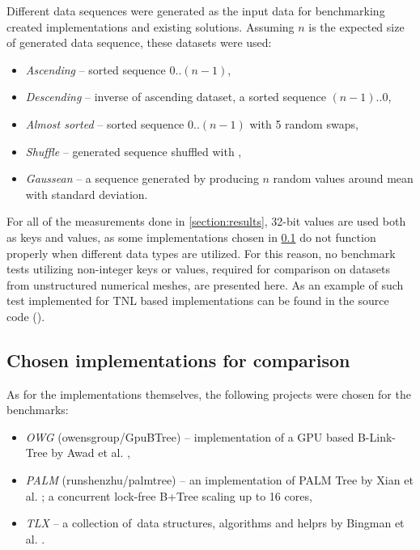 Different data sequences were generated as the input data for benchmarking created implementations and existing solutions. Assuming $n$ is the expected size of generated data sequence, these datasets were used:

\begin{itemize}
  \item \textit{Ascending} -- sorted sequence $0..(n-1)$,
  \item \textit{Descending} -- inverse of ascending dataset, a sorted sequence $(n-1)..0$,
  \item \textit{Almost sorted} -- sorted sequence $0..(n-1)$ with 5 random swaps,
  \item \textit{Shuffle} -- generated sequence shuffled with ,
  \item \textit{Gaussean} -- a sequence generated by producing $n$ random values around mean with standard deviation.
\end{itemize}

For all of the measurements done in \cref{section:results}, 32-bit values are used both as keys and values, as some implementations chosen in \cref{subsection:benchmark:implementations} do not function properly when different data types are utilized. For this reason, no benchmark tests utilizing non-integer keys or values, required for comparison on datasets from unstructured numerical meshes, are presented here. As an example of such test implemented for TNL based implementations can be found in the source code ().

\subsection{Chosen implementations for comparison}\label{subsection:benchmark:implementations}

As for the implementations themselves, the following projects were chosen for the benchmarks:

\begin{itemize}
  \item \textit{OWG} (owensgroup/GpuBTree) -- implementation of a GPU based B-Link-Tree by Awad et al. \cite{awad},
  \item \textit{PALM} (runshenzhu/palmtree) -- an implementation of PALM Tree \cite{palm} by Xian et al. \cite{palm-impl}; a concurrent lock-free B+Tree scaling up to 16 cores,
  \item \textit{TLX} -- a collection of \CC\,data structures, algorithms and helprs by Bingman et al. \cite{TLX}.
\end{itemize}

